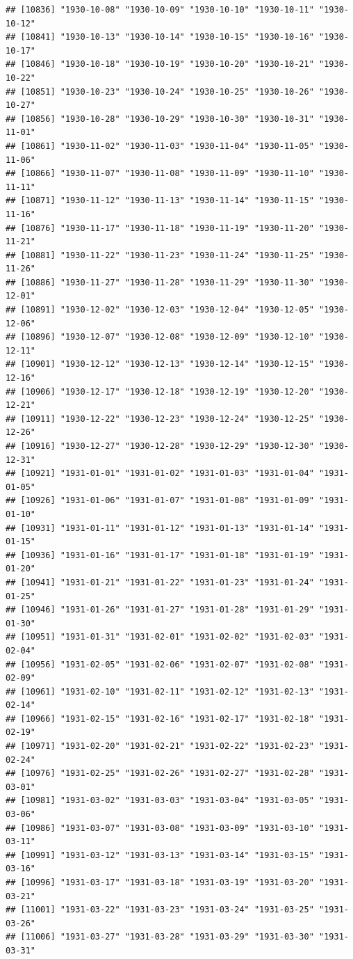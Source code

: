 \documentclass{article}\usepackage[]{graphicx}\usepackage[]{color}
\makeatletter
\newenvironment{kframe}{%
 \def\at@end@of@kframe{}%
 \ifinner\ifhmode%
  \def\at@end@of@kframe{\end{minipage}}%
  \begin{minipage}{\columnwidth}%
 \fi\fi%
 \def\FrameCommand##1{\hskip\@totalleftmargin \hskip-\fboxsep
 \colorbox{shadecolor}{##1}\hskip-\fboxsep
     \hskip-\linewidth \hskip-\@totalleftmargin \hskip\columnwidth}%
 \MakeFramed {\advance\hsize-\width
   \@totalleftmargin\z@ \linewidth\hsize
   \@setminipage}}%
 {\par\unskip\endMakeFramed%
 \at@end@of@kframe}
\newenvironment{knitrout}{}{} %
\makeatother
\begin{document}
\begin{description}
\begin{knitrout}
\begin{kframe}
\begin{verbatim}
## [10836] "1930-10-08" "1930-10-09" "1930-10-10" "1930-10-11" "1930-10-12"
## [10841] "1930-10-13" "1930-10-14" "1930-10-15" "1930-10-16" "1930-10-17"
## [10846] "1930-10-18" "1930-10-19" "1930-10-20" "1930-10-21" "1930-10-22"
## [10851] "1930-10-23" "1930-10-24" "1930-10-25" "1930-10-26" "1930-10-27"
## [10856] "1930-10-28" "1930-10-29" "1930-10-30" "1930-10-31" "1930-11-01"
## [10861] "1930-11-02" "1930-11-03" "1930-11-04" "1930-11-05" "1930-11-06"
## [10866] "1930-11-07" "1930-11-08" "1930-11-09" "1930-11-10" "1930-11-11"
## [10871] "1930-11-12" "1930-11-13" "1930-11-14" "1930-11-15" "1930-11-16"
## [10876] "1930-11-17" "1930-11-18" "1930-11-19" "1930-11-20" "1930-11-21"
## [10881] "1930-11-22" "1930-11-23" "1930-11-24" "1930-11-25" "1930-11-26"
## [10886] "1930-11-27" "1930-11-28" "1930-11-29" "1930-11-30" "1930-12-01"
## [10891] "1930-12-02" "1930-12-03" "1930-12-04" "1930-12-05" "1930-12-06"
## [10896] "1930-12-07" "1930-12-08" "1930-12-09" "1930-12-10" "1930-12-11"
## [10901] "1930-12-12" "1930-12-13" "1930-12-14" "1930-12-15" "1930-12-16"
## [10906] "1930-12-17" "1930-12-18" "1930-12-19" "1930-12-20" "1930-12-21"
## [10911] "1930-12-22" "1930-12-23" "1930-12-24" "1930-12-25" "1930-12-26"
## [10916] "1930-12-27" "1930-12-28" "1930-12-29" "1930-12-30" "1930-12-31"
## [10921] "1931-01-01" "1931-01-02" "1931-01-03" "1931-01-04" "1931-01-05"
## [10926] "1931-01-06" "1931-01-07" "1931-01-08" "1931-01-09" "1931-01-10"
## [10931] "1931-01-11" "1931-01-12" "1931-01-13" "1931-01-14" "1931-01-15"
## [10936] "1931-01-16" "1931-01-17" "1931-01-18" "1931-01-19" "1931-01-20"
## [10941] "1931-01-21" "1931-01-22" "1931-01-23" "1931-01-24" "1931-01-25"
## [10946] "1931-01-26" "1931-01-27" "1931-01-28" "1931-01-29" "1931-01-30"
## [10951] "1931-01-31" "1931-02-01" "1931-02-02" "1931-02-03" "1931-02-04"
## [10956] "1931-02-05" "1931-02-06" "1931-02-07" "1931-02-08" "1931-02-09"
## [10961] "1931-02-10" "1931-02-11" "1931-02-12" "1931-02-13" "1931-02-14"
## [10966] "1931-02-15" "1931-02-16" "1931-02-17" "1931-02-18" "1931-02-19"
## [10971] "1931-02-20" "1931-02-21" "1931-02-22" "1931-02-23" "1931-02-24"
## [10976] "1931-02-25" "1931-02-26" "1931-02-27" "1931-02-28" "1931-03-01"
## [10981] "1931-03-02" "1931-03-03" "1931-03-04" "1931-03-05" "1931-03-06"
## [10986] "1931-03-07" "1931-03-08" "1931-03-09" "1931-03-10" "1931-03-11"
## [10991] "1931-03-12" "1931-03-13" "1931-03-14" "1931-03-15" "1931-03-16"
## [10996] "1931-03-17" "1931-03-18" "1931-03-19" "1931-03-20" "1931-03-21"
## [11001] "1931-03-22" "1931-03-23" "1931-03-24" "1931-03-25" "1931-03-26"
## [11006] "1931-03-27" "1931-03-28" "1931-03-29" "1931-03-30" "1931-03-31"

\end{verbatim}
\end{kframe}
\end{knitrout}
\end{description}
\end{document}
